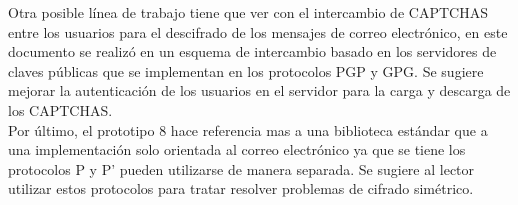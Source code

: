 Otra posible línea de trabajo tiene que ver con el intercambio de CAPTCHAS entre los usuarios para el descifrado de los mensajes de correo electrónico, en este documento se realizó en un esquema de intercambio basado en los servidores de claves públicas que se implementan en los protocolos PGP y GPG. Se sugiere mejorar la autenticación  de los usuarios en el servidor para la carga y descarga de los CAPTCHAS.\\

Por último, el prototipo 8 hace referencia mas a una biblioteca estándar que a una implementación solo orientada al correo electrónico ya que se tiene los protocolos P y P’ pueden utilizarse de manera separada. Se sugiere al lector utilizar estos protocolos para tratar resolver problemas de cifrado simétrico.
